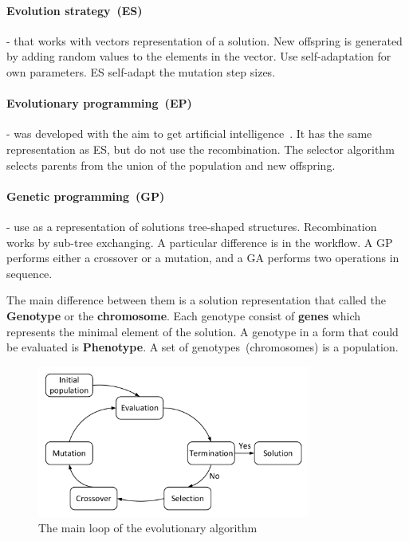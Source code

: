 \paragraph{Evolution strategy~(ES)} - that works with vectors representation of a solution. New offspring is generated by adding random values to the elements in the vector. Use self-adaptation for own parameters. ES self-adapt the mutation step sizes.
\paragraph{Evolutionary programming~(EP)} - was developed with the aim to get artificial intelligence~\cite{eiben03}. It has the same representation as ES, but do not use the recombination. The selector algorithm selects parents from the union of the population and new offspring.
\paragraph{Genetic programming~(GP)} - use as a representation of solutions tree-shaped structures. Recombination works by sub-tree exchanging. A particular difference is in the workflow. A GP performs either a crossover or a mutation, and a GA performs two operations in sequence.

The main difference between them is a solution representation that called the \textbf{Genotype} or the \textbf{chromosome}. Each genotype consist of \textbf{genes} which represents the minimal element of the solution. A genotype in a form that could be evaluated is \textbf{Phenotype}. A set of genotypes~(chromosomes) is a population.

\begin{figure}
	\centering
	\includegraphics[width=0.8\textwidth]{images/GeneticLoop.pdf}
	\caption[The main loop of the evolutionary algorithm]{The main loop of the evolutionary algorithm}
	\label{fig:GeneticLoop}
\end{figure}

